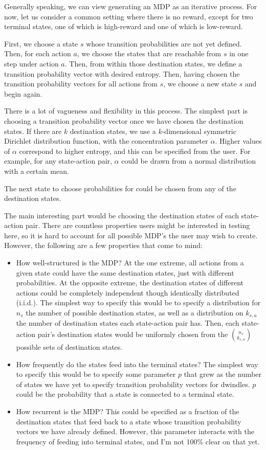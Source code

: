 \documentclass{article}
\begin{document}
Generally speaking, we can view generating an MDP as an iterative process. For now, let us consider a common setting where there is no reward, except for two terminal states, one of which is high-reward and one of which is low-reward.

First, we choose a state $s$ whose transition probabilities are not yet defined. Then, for each action $a$, we choose the states that are reachable from $s$ in one step under action $a$. Then, from within those destination states, we define a transition probability vector with desired entropy. Then, having chosen the transition probability vectors for all actions from $s$, we choose a new state $s$ and begin again.

There is a lot of vagueness and flexibility in this process. The simplest part is choosing a transition probability vector once we have chosen the destination states. If there are $k$ destination states, we use a $k$-dimensional symmetric Dirichlet distribution function, with the concentration parameter $\alpha$. Higher values of $\alpha$ correspond to higher entropy, and this can be specified from the user. For example, for any state-action pair, $\alpha$ could be drawn from a normal distribution with a certain mean.

The next state to choose probabilities for could be chosen from any of the destination states.

The main interesting part would be choosing the destination states of each state-action pair. There are countless properties users might be interested in testing here, so it is hard to account for all possible MDP's the user may wish to create. However, the following are a few properties that come to mind:

\begin{itemize}
  \item How well-structured is the MDP? At the one extreme, all actions from a given state could have the same destination states, just with different probabilities. At the opposite extreme, the destination states of different actions could be completely independent though identically distributed (i.i.d.). The simplest way to specify this would be to specify a distribution for $n_s$ the number of possible destination states, as well as a distribution on $k_{s,a}$ the number of destination states each state-action pair has. Then, each state-action pair's destination states would be uniformly chosen from the $\binom{n_s}{k_{s,a}}$ possible sets of destination states.
  \item How frequently do the states feed into the terminal states? The simplest way to specify this would be to specify some parameter $p$ that grew as the number of states we have yet to specify transition probability vectors for dwindles. $p$ could be the probability that a state is connected to a terminal state.
  \item How recurrent is the MDP? This could be specified as a fraction of the destination states that feed back to a state whose transition probability vectors we have already defined. However, this parameter interacts with the frequency of feeding into terminal states, and I'm not 100\% clear on that yet.
\end{itemize}
\end{document}

